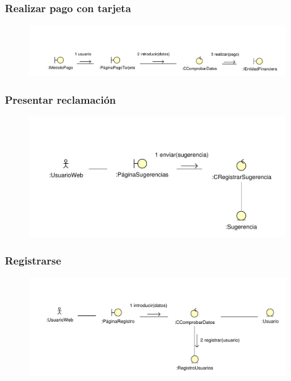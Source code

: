 \documentclass[11pt, a4paper, twoside, titlepage]{article}
\begin{document}
			\subsubsection{Realizar pago con tarjeta} \label{ana:tarjeta}
				\begin{figure}[H]\centering
					\includegraphics[scale=.7]{diagramas/pagotarjeta.pdf}
				\end{figure}

			\subsubsection{Presentar reclamación}
				\begin{figure}[H]\centering
					\includegraphics[scale=.82]{diagramas/presentarreclamacion.pdf}
				\end{figure}

			\subsubsection{Registrarse}
				\begin{figure}[H]\centering
					\includegraphics[scale=.8]{diagramas/registrarse.pdf}
				\end{figure}
\end{document}
